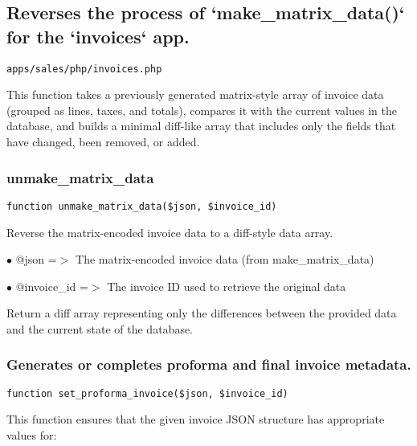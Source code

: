 \documentclass[a4paper]{article}
\begin{document}
\hypertarget{toc164}{}
\subsection{Reverses the process of `make\_matrix\_data()` for the `invoices` app.}

\begin{lstlisting}
apps/sales/php/invoices.php
\end{lstlisting}

This function takes a previously generated matrix-style array of invoice data
(grouped as lines, taxes, and totals), compares it with the current values
in the database, and builds a minimal diff-like array that includes only
the fields that have changed, been removed, or added.

\hypertarget{toc165}{}
\subsubsection{unmake\_matrix\_data}

\begin{lstlisting}
function unmake_matrix_data($json, $invoice_id)
\end{lstlisting}

Reverse the matrix-encoded invoice data to a diff-style data array.

\begin{compactitem}
\item[\color{myblue}$\bullet$] @json       =$>$ The matrix-encoded invoice data (from make\_matrix\_data)
\item[\color{myblue}$\bullet$] @invoice\_id =$>$ The invoice ID used to retrieve the original data
\end{compactitem}

Return a diff array representing only the differences between the provided
data and the current state of the database.

\hypertarget{toc166}{}
\subsubsection{Generates or completes proforma and final invoice metadata.}

\begin{lstlisting}
function set_proforma_invoice($json, $invoice_id)
\end{lstlisting}

This function ensures that the given invoice JSON structure has appropriate values for:
\end{document}
